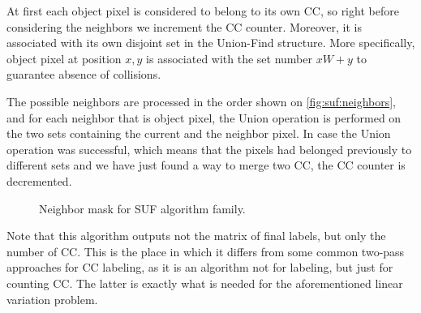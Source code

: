 \documentclass[hidelinks]{llncs}
\newcommand{\texten}[1]{#1}
\newcommand{\textru}[1]{}
\begin{document}
\texten{
At first each object pixel is considered to belong to its own CC, so right
before considering the neighbors we increment the CC counter. Moreover, it is
associated with its own disjoint set in the Union-Find structure. More
specifically, object pixel at position $x, y$ is associated with the set number
$xW + y$ to guarantee absence of collisions.
}\textru{
Каждый объектный пиксель сначала предполагается принадлежащим своей КС.
Поэтому прежде чем начинать рассматривать соседей, мы увеличиваем счётчик.
Более того того, каждый пиксель изначально ассоциирован со своим собственным
независимым множеством в структуре Union-Find, состоящем из одного элемента.
Конкретно пиксель в позиции $x, y$ заранее ассоциирован с элементом номер $xW +
y$, чтобы гарантировать отсутствие коллизий.
}

\texten{
The possible neighbors are processed in the order shown on
\autoref{fig:suf:neighbors}, and for each neighbor that is object pixel, the
Union operation is performed on the two sets containing the current and the
neighbor pixel. In case the Union operation was successful, which means that the
pixels had belonged previously to different sets and we have just found a way to
merge two CC, the CC counter is decremented.
}\textru{
Возможные соседи перебираются в порядке, показанном на
\autoref{fig:suf:neighbors}.
Для каждого объектного пикселя, который напрямую соседствует с текущим, мы
применяем операцию Union для множества, содержащих текущий пиксель и
множества, содержащего этого соседа.
Если эти множества не совпадали, то мы нашли место, где КС соединяются.
В этом случае уменьшаем счётчик на 1.
}

\begin{figure}
  \centering
  \caption{Neighbor mask for SUF algorithm family.}
  \label{fig:suf:neighbors}
\end{figure}

\texten{
Note that this algorithm outputs not the matrix of final labels, but only the
number of CC. This is the place in which it differs from some common two-pass
approaches for CC labeling, as it is an algorithm not for labeling, but just for
counting CC. The latter is exactly what is needed for the aforementioned linear
variation problem.
}\textru{
Отметим, что этот алгоритм выдаёт не матрицу финальных меток, а только
количество компонент связности.
Именно в этом месте он отличается от некоторых известных подходов к CC labeling.
Для текущей задачи нам нужно именно считать компоненты связности.
}
\end{document}
